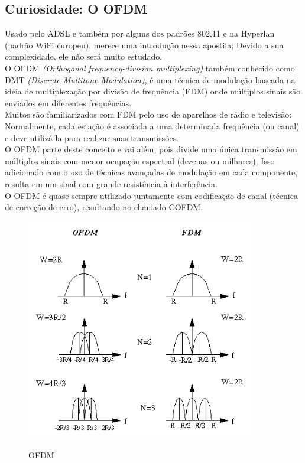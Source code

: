 \documentclass{article}
\begin{document}
\subsection{Curiosidade: O OFDM}
Usado pelo ADSL e também por alguns dos padrões 802.11 e na Hyperlan (padrão
WiFi europeu), merece uma introdução nessa apostila; Devido a sua complexidade,
ele não será muito estudado. \\ O OFDM \textit{(Orthogonal frequency-division
multiplexing)} também conhecido como DMT \textit{(Discrete Multitone
Modulation)}, é uma técnica de modulação baseada na idéia de multiplexação por
divisão de frequência (FDM) onde múltiplos sinais são enviados em diferentes
frequências.\\ Muitos são familiarizados com FDM pelo uso de aparelhos de rádio
e televisão: Normalmente, cada estação é associada a uma determinada frequência
(ou canal) e deve utilizá-la para realizar suas transmissões.\\ O OFDM parte
deste conceito e vai além, pois divide uma única transmissão em múltiplos sinais
com menor ocupação espectral (dezenas ou milhares); Isso adicionado com o uso de
técnicas avançadas de modulação em cada componente, resulta em um sinal com
grande resistência à interferência.\\ O OFDM é quase sempre utilizado juntamente
com codificação de canal (técnica de correção de erro), resultando no chamado
COFDM.

\begin{figure}[h]
    \center
    \includegraphics[width=10cm]{imagens/ofdm.png}
    \label{ofdm}
    \caption{OFDM}
\end{figure}
\end{document}
